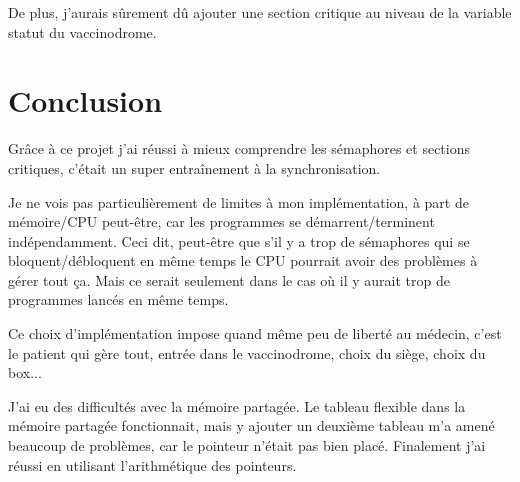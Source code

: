 \documentclass[a4paper]{article}
\begin{document}
De plus, j'aurais sûrement dû ajouter une section critique au niveau de la variable statut du vaccinodrome.

\section{Conclusion}

Grâce à ce projet j'ai réussi à mieux comprendre les sémaphores et sections critiques, c'était un super  entraînement à la synchronisation.\par
 Je ne vois pas particulièrement de limites à mon implémentation, à part de mémoire/CPU peut-être, car les programmes se démarrent/terminent indépendamment. Ceci dit, peut-être que s'il y a trop de sémaphores qui se bloquent/débloquent en même temps le CPU pourrait avoir des problèmes à gérer tout ça. Mais ce serait seulement dans le cas où il y aurait trop de programmes lancés en même temps.\par
 Ce choix d'implémentation impose quand même peu de liberté au médecin, c'est le patient qui gère tout, entrée dans le vaccinodrome, choix du siège, choix du box...\par
  J'ai eu des difficultés avec la mémoire partagée. Le tableau flexible dans la mémoire partagée fonctionnait, mais y ajouter un deuxième tableau m'a amené beaucoup de problèmes, car le pointeur n'était pas bien placé. Finalement j'ai réussi en utilisant l'arithmétique des pointeurs.
\end{document}
